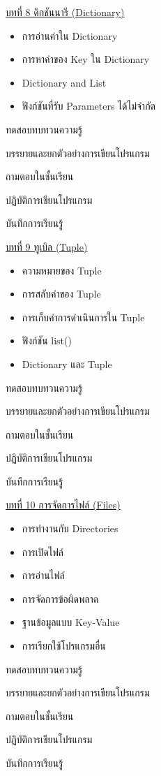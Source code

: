 {
\underline{บทที่ 8 ดิกชันนารี (Dictionary)}
\begin{itemize}
\item การอ่านค่าใน Dictionary
\item การหาค่าของ Key ใน Dictionary
\item Dictionary and List
\item ฟังก์ชันที่รับ Parameters ได้ไม่จำกัด
\end{itemize}
}
{
\item ทดสอบทบทวนความรู้
\item  บรรยายและยกตัวอย่างการเขียนโปรแกรม
\item  ถามตอบในชั้นเรียน
\item  ปฏิบัติการเขียนโปรแกรม
\item  บันทึกการเรียนรู้
}
{
\underline{บทที่ 9 ทูเบิล (Tuple)}
\begin{itemize}
\item ความหมายของ Tuple
\item การสลับค่าของ Tuple
\item การเก็บค่าการดำเนินการใน Tuple
\item ฟังก์ชัน list()
\item Dictionary และ Tuple
\end{itemize}
}
{
\item ทดสอบทบทวนความรู้
\item  บรรยายและยกตัวอย่างการเขียนโปรแกรม
\item  ถามตอบในชั้นเรียน
\item  ปฏิบัติการเขียนโปรแกรม
\item  บันทึกการเรียนรู้
}
{
\underline{บทที่ 10 การจัดการไฟล์ (Files)}
\begin{itemize}
\item การทำงานกับ Directories
\item การเปิดไฟล์
\item การอ่านไฟล์
\item การจัดการข้อผิดพลาด
\item ฐานข้อมูลแบบ Key-Value
\item การเรียกใช้โปรแกรมอื่น
\end{itemize}
}
{
\item ทดสอบทบทวนความรู้
\item  บรรยายและยกตัวอย่างการเขียนโปรแกรม
\item  ถามตอบในชั้นเรียน
\item  ปฏิบัติการเขียนโปรแกรม
\item  บันทึกการเรียนรู้
}
